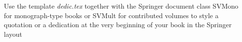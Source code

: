 %
%
%

\begin{dedication}
Use the template \emph{dedic.tex} together with the Springer document class SVMono for monograph-type books or SVMult for contributed volumes to style a quotation or a dedication at the very beginning of your book in the Springer layout
\end{dedication}





